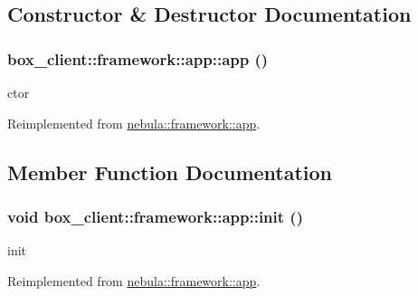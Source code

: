 \subsection{Constructor \& Destructor Documentation}
\hypertarget{classbox__client_1_1framework_1_1app_ab7875665a67c5ad9ca66e0250242f994}{
\subsubsection[{app}]{\setlength{\rightskip}{0pt plus 5cm}box\_\-client::framework::app::app ()}}
\label{classbox__client_1_1framework_1_1app_ab7875665a67c5ad9ca66e0250242f994}


ctor 

Reimplemented from \hyperlink{classnebula_1_1framework_1_1app_a6647b29dd741f88e1d8a6d0246935ffd}{nebula::framework::app}.

\subsection{Member Function Documentation}
\hypertarget{classbox__client_1_1framework_1_1app_ad7d207b90de357901f98ec1849b6d296}{
\subsubsection[{init}]{\setlength{\rightskip}{0pt plus 5cm}void box\_\-client::framework::app::init ()}}
\label{classbox__client_1_1framework_1_1app_ad7d207b90de357901f98ec1849b6d296}


init 

Reimplemented from \hyperlink{classnebula_1_1framework_1_1app_a8ec897736c54f5ee32f4b9827ac403fa}{nebula::framework::app}.

